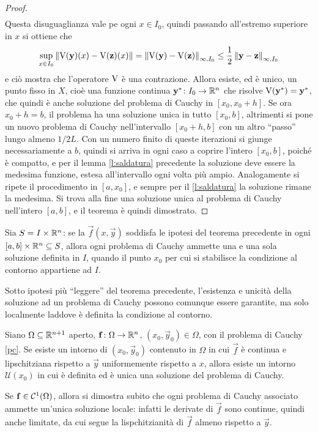 \begin{proof}
\begin{align*}
\end{align*}
Questa disuguaglianza vale pe ogni $x\in I_0$, quindi passando all'estremo superiore in $x$ si ottiene che
\[
\sup_{x\in I_0}\left\|{\operatorname{V}(\mathbf{y})(x)-\operatorname{V}(\mathbf{z})(x)}\right\|=\left\|{\operatorname{V}(\mathbf{y})-\operatorname{V}(\mathbf{z})}\right\|_{\infty,I_0}\leq\frac12\left\|{\mathbf{y}-\mathbf{z}}\right\|_{\infty,I_0}
\]
e ciò mostra che l'operatore $\operatorname{V}$ è una contrazione. Allora esiste, ed è unico, un punto fisso in $X$, cioè una funzione continua $\mathbf{y}^*\colon I_0\to\mathbb{R}^n$ che risolve $\operatorname{V}(\mathbf{y}^*)=\mathbf{y}^*$, che quindi è anche soluzione del problema di Cauchy in $[x_0,x_0+h]$.
Se ora $x_0+h=b$, il problema ha una soluzione unica in tutto $[x_0,b]$, altrimenti si pone un nuovo problema di Cauchy nell'intervallo $[x_0+h,b]$ con un altro ``passo'' lungo almeno $1/2L$. Con un numero finito di queste iterazioni si giunge necessariamente a $b$, quindi si arriva in ogni caso a coprire l'intero $[x_0,b]$, poiché è compatto, e per il lemma \ref{l:saldatura} precedente la soluzione deve essere la medesima funzione, estesa all'intervallo ogni volta più ampio. Analogamente si ripete il procedimento in $[a,x_0]$, e sempre per il \ref{l:saldatura} la soluzione rimane la medesima. Si trova alla fine una soluzione unica al problema di Cauchy nell'intero $[a,b]$, e il teorema è quindi dimostrato.
\end{proof}

\begin{corollario}
Sia $S=I\times\mathbb{R}^n$: se la $\vec f(x,\vec y)$ soddisfa le ipotesi del teorema precedente in ogni $[a,b]\times\mathbb{R}^n\subseteq S$, allora ogni problema di Cauchy ammette una e una sola soluzione definita in $I$, quando il punto $x_0$ per cui si stabilisce la condizione al contorno appartiene ad $I$.
\end{corollario}

Sotto ipotesi più ``leggere'' del teorema precedente, l'esistenza e unicità della soluzione ad un problema di Cauchy possono comunque essere garantite, ma solo localmente laddove è definita la condizione al contorno.
\begin{teorema} \label{t:E-locale}
Siano $\Omega\subseteq\mathbb{R}^{n+1}$ aperto, $\mathbf{f}\colon\Omega\to\mathbb{R}^n$, $(x_0,\vec y_0)\in\Omega$, con il problema di Cauchy \eqref{pc}. Se esiste un intorno di $(x_0,\vec y_0)$ contenuto in $\Omega$ in cui $\vec f$ è continua e lipschitziana rispetto a $\vec y$ uniformemente rispetto a $x$, allora esiste un intorno $\mathcal U(x_0)$ in cui è definita ed è unica una soluzione del problema di Cauchy.
\end{teorema}
Se $\mathbf{f}\in\mathcal{C}^{{1}}(\Omega)$, allora si dimostra subito che ogni problema di Cauchy associato ammette un'unica soluzione locale: infatti le derivate di $\vec f$ sono continue, quindi anche limitate, da cui segue la lispchitzianità di $\vec f$ almeno rispetto a $\vec y$.

